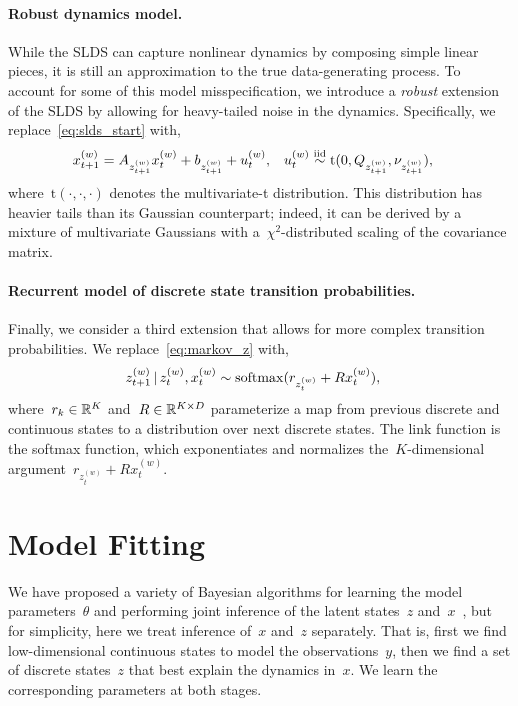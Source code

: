 \documentclass{article}
\begin{document}
\paragraph{Robust dynamics model.}  While the SLDS can capture nonlinear
dynamics by composing simple linear pieces, it is still an approximation
to the true data-generating process.  To account for some of this
model misspecification, we introduce a \emph{robust} extension of the
SLDS by allowing for heavy-tailed noise in the dynamics.  Specifically,
we replace~\eqref{eq:slds_start} with,
\begin{align}
  x_{t+1}^{(w)} &= A_{z_{t+1}^{(w)}} x_{t}^{(w)} + b_{z_{t+1}^{(w)}} +  u_t^{(w)},
  &
  u_t^{(w)} &\stackrel{\text{iid}}{\sim} \mathrm{t}(0, Q_{z_{t+1}^{(w)}}, \nu_{z_{t+1}^{(w)}}),
\end{align}
where~$\mathrm{t}(\cdot, \cdot, \cdot)$ denotes the multivariate-t
distribution.  This distribution has heavier tails than its Gaussian
counterpart; indeed, it can be derived by a mixture of multivariate
Gaussians with a~$\chi^2$-distributed scaling of the covariance matrix. 

\paragraph{Recurrent model of discrete state transition probabilities.}
Finally, we consider a third extension that allows for more complex
transition probabilities.  We replace~\eqref{eq:markov_z} with,
\begin{align}
  z_{t+1}^{(w)} \,|\, z_t^{(w)}, x_t^{(w)}
  &\sim \mathrm{softmax}(r_{z_t^{(w)}} + R x_t^{(w)}),
    \label{eq:recurrent}
\end{align}
where~${r_k \in \mathbb{R}^K}$ and~${R \in \mathbb{R}^{K \times D}}$
parameterize a map from previous discrete and continuous states to a
distribution over next discrete states.  The link function is the
softmax function, which exponentiates and normalizes
the~$K$-dimensional argument~${r_{z_t^{(w)}} + R x_t^{(w)}}$.

\section{Model Fitting}

We have proposed a variety of Bayesian algorithms for learning the
model parameters~$\theta$ and performing joint inference of the
latent states~$z$ and~$x$~\citep{linderman2017recurrent, linderman2017structure},
but for simplicity, here we treat inference of~$x$ and~$z$ separately.
That is, first we find low-dimensional continuous states to model the
observations~$y$, then we find a set of discrete states~$z$ that best
explain the dynamics in~$x$. We learn the corresponding parameters
at both stages.
\end{document}
